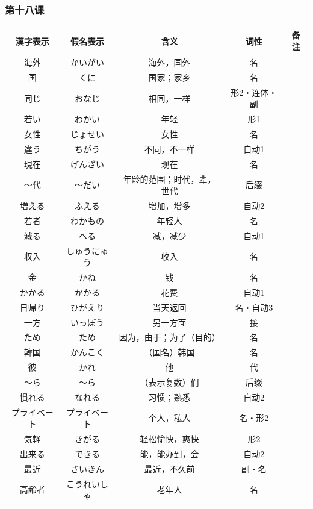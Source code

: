 \subsubsection{第十八课}
\begin{longtable}{|c|c|c|c|c|}
    \hline
漢字表示 & 假名表示  & 含义 & 词性 & 备注 \\ \hline\hline
海外 & かいがい & 海外，国外 & 名 & \\ \hline
国 & くに & 国家；家乡 & 名 & \\ \hline
同じ & おなじ & 相同，一样 & 形2・连体・副 & \\ \hline
若い & わかい & 年轻 & 形1 & \\ \hline
女性 & じょせい & 女性 & 名 & \\ \hline
違う & ちがう & 不同，不一样 & 自动1 & \\ \hline
現在 & げんざい & 现在 & 名 & \\ \hline
〜代 & 〜だい & 年龄的范围；时代，辈，世代 & 后缀 & \\ \hline
増える & ふえる & 增加，增多 & 自动2 & \\ \hline
若者 & わかもの & 年轻人 & 名 & \\ \hline
減る & へる & 减，减少 & 自动1 & \\ \hline
収入 & しゅうにゅう & 收入 & 名 & \\ \hline
金 & かね & 钱 & 名 & \\ \hline
かかる & かかる & 花费 & 自动1 & \\ \hline
日帰り & ひがえり & 当天返回 & 名・自动3 & \\ \hline
一方 & いっぽう & 另一方面 & 接 & \\ \hline
ため & ため & 因为，由于；为了（目的） & 名 & \\ \hline
韓国 & かんこく & （国名）韩国 & 名 & \\ \hline
彼 & かれ & 他 & 代 & \\ \hline
〜ら & 〜ら & （表示复数）们 & 后缀 & \\ \hline
慣れる & なれる & 习惯；熟悉 & 自动2 & \\ \hline
プライベート & プライベート & 个人，私人 & 名・形2 & \\ \hline
気軽 & きがる & 轻松愉快，爽快 & 形2 & \\ \hline
出来る & できる & 能，能办到，会 & 自动2 & \\ \hline
最近 & さいきん & 最近，不久前 & 副・名 & \\ \hline
高齢者 & こうれいしゃ & 老年人 & 名 & \\ \hline

\end{longtable}
